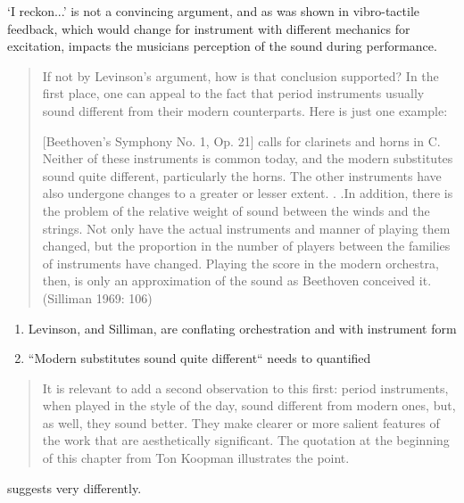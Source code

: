 `I reckon...' is not a convincing argument, and as was shown in
\cite{fontana_musical_2018, charalampos-saitis_musical_2018,
merchel_musical_2018} vibro-tactile feedback, which would change for instrument
with different mechanics for excitation, impacts the musicians perception of the
sound during performance.

\begin{quotation}
If not by Levinson's argument, how is that conclusion supported? In the first
place, one can appeal to the fact that period instruments usually sound
different from their modern counterparts. Here is just one example:

[Beethoven's Symphony No. 1, Op. 21] calls for clarinets and horns in C. Neither
of these instruments is common today, and the modern substitutes sound quite
different, particularly the horns. The other instruments have also undergone
changes to a greater or lesser extent. . .In addition, there is the problem of
the relative weight of sound between the winds and the strings. Not only have
the actual instruments and manner of playing them changed, but the proportion in
the number of players between the families of instruments have changed. Playing
the score in the modern orchestra, then, is only an approximation of the sound
as Beethoven conceived it. (Silliman 1969: 106)
\end{quotation}

\begin{enumerate}
    \item Levinson, and Silliman, are conflating orchestration and with
    instrument form
    \item ``Modern substitutes sound quite different`` needs to quantified    
\end{enumerate}

\begin{quotation}
It is relevant to add a second observation to this first: period instruments,
when played in the style of the day, sound different from modern ones, but, as
well, they sound better. They make clearer or more salient features of the work
that are aesthetically significant. The quotation at the beginning of this
chapter from Ton Koopman illustrates the point.
\end{quotation}

\cite{fritz_listener_2017} suggests very differently.


